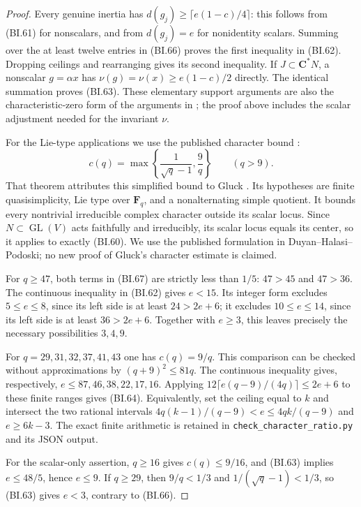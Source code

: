 \begin{proof}
Every genuine inertia has $d(g_j)\ge\lceil e(1-c)/4\rceil$:
this follows from (BI.61) for nonscalars, and from $d(g_j)=e$ for
nonidentity scalars.  Summing over the at least twelve entries in
(BI.66) proves the first inequality in (BI.62).  Dropping ceilings
and rearranging gives its second inequality.  If
$J\subset\mathbf C^*N$, a nonscalar $g=\alpha x$ has
$\nu(g)=\nu(x)\ge e(1-c)/2$ directly.  The identical summation
proves (BI.63).  These elementary support arguments are also the
characteristic-zero form of the arguments in
\cite[Definition~2.3 and Lemma~2.4, pp.~137--138;
Lemma~3.1, p.~139]{BI:DHP}; the proof above includes the scalar
adjustment needed for the invariant $\nu$.

For the Lie-type applications we use the published character bound
\cite[Theorem~4.1(2), p.~141]{BI:DHP}:
\[
 c(q)=\max\left\{\frac1{\sqrt q-1},\frac9q\right\}
                 \qquad(q>9).                              \tag{BI.67}
\]
That theorem attributes this simplified bound to Gluck
\cite{BI:Gluck1995}.  Its hypotheses are finite quasisimplicity,
Lie type over $\mathbf F_q$, and a nonalternating simple quotient.
It bounds every nontrivial irreducible complex character outside
its scalar locus.  Since $N\subset\operatorname{GL}(V)$ acts
faithfully and irreducibly, its scalar locus equals its center, so
it applies to exactly (BI.60).  We use the published formulation
in Duyan--Halasi--Podoski; no new proof of Gluck's character estimate
is claimed.

For $q\ge47$, both terms in (BI.67) are strictly less than $1/5$:
$47>45$ and $47>36$.  The continuous inequality in (BI.62) gives
$e<15$.  Its integer form excludes $5\le e\le8$, since its left
side is at least $24>2e+6$; it excludes $10\le e\le14$, since its
left side is at least $36>2e+6$.  Together with $e\ge3$, this
leaves precisely the necessary possibilities $3,4,9$.

For $q=29,31,32,37,41,43$ one has $c(q)=9/q$.  This comparison can
be checked without approximations by
$(q+9)^2\le81q$.  The continuous inequality gives, respectively,
$e\le87,46,38,22,17,16$.  Applying
$12\lceil e(q-9)/(4q)\rceil\le2e+6$ to these finite ranges
gives (BI.64).  Equivalently, set the ceiling equal to $k$ and
intersect the two rational intervals
$4q(k-1)/(q-9)<e\le4qk/(q-9)$ and $e\ge6k-3$.
The exact finite arithmetic is retained in
\texttt{check\_character\_ratio.py} and its JSON output.

For the scalar-only assertion, $q\ge16$ gives $c(q)\le9/16$,
and (BI.63) implies $e\le48/5$, hence $e\le9$.  If $q\ge29$,
then $9/q<1/3$ and $1/(\sqrt q-1)<1/3$, so (BI.63) gives
$e<3$, contrary to (BI.66).


\end{proof}
